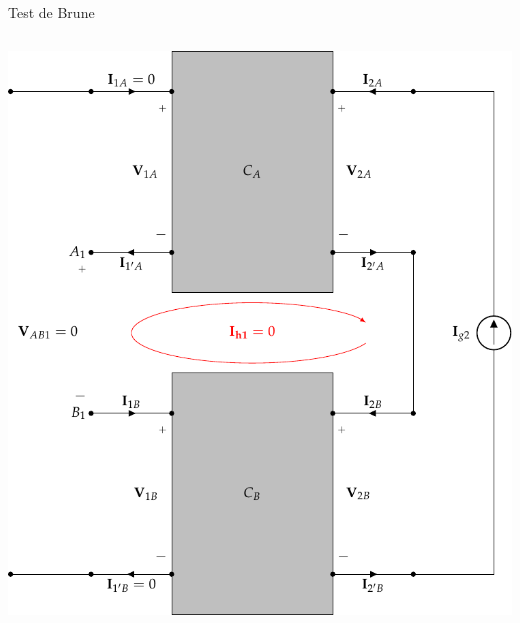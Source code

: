 \documentclass[xcolor={usenames,svgnames,dvipsnames}]{beamer}
\begin{document}
\begin{frame}[label={sec:orgabb371a},plain]{Test de Brune}
\begin{columns}
\begin{column}{0.65\columnwidth}
\begin{center}
\includegraphics[width=.9\linewidth]{figs/serie-serie-brune-salida.pdf}
\end{center}
\end{column}
\end{columns}
\end{frame}
\end{document}
